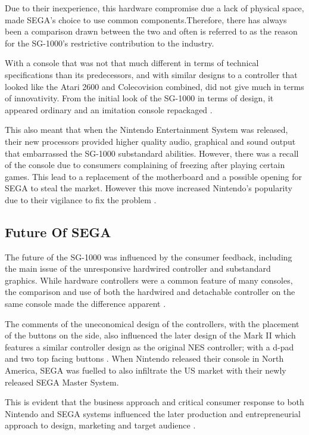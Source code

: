 \documentclass{scrartcl}
\begin{document}
Due to their inexperience, this hardware compromise due a lack of physical space, made SEGA’s choice to use common components.Therefore, there has always been a comparison drawn between the two and often is referred to as the reason for the SG-1000’s restrictive contribution to the industry.

With a console that was not that much different in terms of technical specifications than its predecessors, and with similar designs to a controller that looked like the Atari 2600 and Colecovision combined, did not give much in terms of innovativity. From the initial look of the SG-1000 in terms of design, it appeared ordinary and an imitation console repackaged \cite{SegaSG-1000}. 

This also meant that when the Nintendo Entertainment System was released, their new processors provided higher quality audio, graphical and sound output that embarrassed the SG-1000 substandard abilities. However, there was a recall of the console due to consumers complaining of freezing after playing certain games. This lead to a replacement of the motherboard and a possible opening for SEGA to steal the market. However this move increased Nintendo’s popularity due to their vigilance to fix the problem \cite{Loguidice2014}.
	
	\subsection{Future Of SEGA}

The future of the SG-1000 was influenced by the consumer feedback, including the main issue of the unresponsive hardwired controller and substandard graphics. While hardware controllers were a common feature of many consoles, the comparison and use of both the hardwired and detachable controller on the same console made the difference apparent \cite{VideoGameConsoleLibrary}.

The comments of the uneconomical design of the controllers, with the placement of the buttons on the side, also influenced the later design of the Mark II which features a similar controller design as the original NES controller; with a d-pad and two top facing buttons \cite{ChrisKohler2009}. When Nintendo released their console in North America, SEGA was fuelled to also infiltrate the US market with their newly released SEGA Master System. 

This is evident that the business approach and critical consumer response to both Nintendo and SEGA systems influenced the later production and entrepreneurial approach to design, marketing and target audience \cite{Kent2010TheBattle}.
\end{document}

